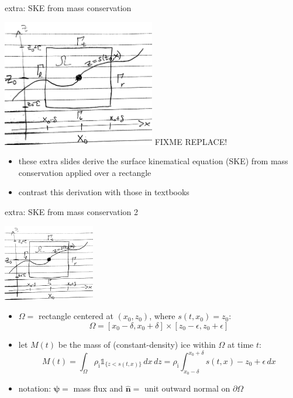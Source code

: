 \documentclass[10pt]{beamer}
\newcommand{\hbn}{\hat{\mathbf{n}}}
\newcommand{\bpsi}{\bm{\psi}}
\newcommand{\eps}{\epsilon}
\newcommand{\rhoi}{\rho_{\text{i}}}
\begin{document}
\begin{frame}{extra: SKE from mass conservation}
\begin{center}
\includegraphics[width=0.5\textwidth]{skemassconservation.jpg} FIXME REPLACE!
\end{center}

\begin{itemize}
\item these extra slides derive the surface kinematical equation (SKE) from mass conservation applied over a rectangle
\item contrast this derivation with those in textbooks \cite{GreveBlatter2009,vanderVeen2013}
\end{itemize}
\end{frame}

\begin{frame}{extra: SKE from mass conservation 2}
\begin{center}
\includegraphics[width=0.3\textwidth]{skemassconservation.jpg}
\end{center}

\begin{itemize}
\item $\Omega = $ rectangle centered at $(x_0,z_0)$, where $s(t,x_0)=z_0$:
   $$\Omega=[x_0-\delta,x_0+\delta] \times [z_0-\eps,z_0+\eps]$$
\item let $M(t)$ be the mass of (constant-density) ice within $\Omega$ at time $t$:
   $$M(t) = \int_\Omega \rhoi \mathbb{1}_{\{z<s(t,x)\}}\,dx\,dz = \rhoi \int_{x_0-\delta}^{x_0+\delta} s(t,x) - z_0 + \eps\,dx$$
\item notation: $\bpsi =$ mass flux and $\hbn =$ unit outward normal on $\partial\Omega$
\end{itemize}
\end{frame}
\end{document}
